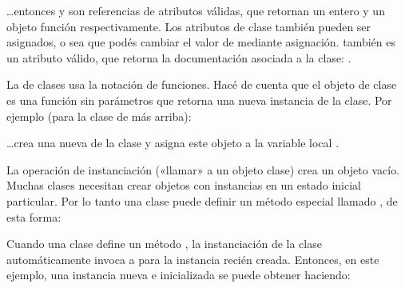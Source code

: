 \documentclass[a5paper,10pt,spanish]{sphinxmanual}
\begin{document}
\sphinxAtStartPar
…entonces  y  son referencias de atributos válidas, que retornan un entero y un objeto función respectivamente.  Los atributos de clase también pueden ser asignados, o sea que podés cambiar el valor de  mediante asignación.   también es un atributo válido, que retorna la documentación asociada a la clase: .

\sphinxAtStartPar
La  de clases usa la notación de funciones.  Hacé de cuenta que el objeto de clase es una función sin parámetros que retorna una nueva instancia de la clase.  Por ejemplo (para la clase de más arriba):

\begin{sphinxVerbatim}[commandchars=\\\{\}]
  
\end{sphinxVerbatim}

\sphinxAtStartPar
…crea una nueva  de la clase y asigna este objeto a la variable local .

\sphinxAtStartPar
La operación de instanciación («llamar» a un objeto clase) crea un objeto vacío.  Muchas clases necesitan crear objetos con instancias en un estado inicial particular.  Por lo tanto una clase puede definir un método especial llamado , de esta forma:

\begin{sphinxVerbatim}[commandchars=\\\{\}]
 
      \PYG{p}{[}\PYG{p}{]}
\end{sphinxVerbatim}

\sphinxAtStartPar
Cuando una clase define un método , la instanciación de la clase automáticamente invoca a  para la instancia recién creada.  Entonces, en este ejemplo, una instancia nueva e inicializada se puede obtener haciendo:

\begin{sphinxVerbatim}[commandchars=\\\{\}]
  
\end{sphinxVerbatim}
\end{document}

